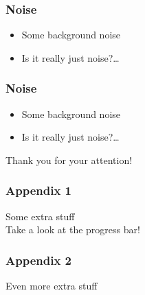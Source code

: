 \documentclass[mathserif, fleqn]{beamer}
\begin{document}
{
  \begin{frame}\frametitle{Noise}
    \begin{itemize}
    \item Some background noise
    \item Is it really just noise?\ldots
    \end{itemize}
  \end{frame}
}

\addtocounter{framenumber}{-1}
{
  \begin{frame}\frametitle{Noise}
    \begin{itemize}
    \item Some background noise
    \item Is it really just noise?\ldots
    \end{itemize}
  \end{frame}
}

\begin{frame}[plain,c]
  \renewcommand*\item{\olditem[]}
  \begin{center}
    \textcolor{aiphired}{\LARGE Thank you for your attention!}
  \end{center}
\end{frame}

\appendix
\backupbegin

\begin{frame}\frametitle{Appendix 1}
  Some extra stuff\\[2ex]
  Take a look at the progress bar!
\end{frame}

\begin{frame}\frametitle{Appendix 2}
  Even more extra stuff
\end{frame}

\backupend
\end{document}
